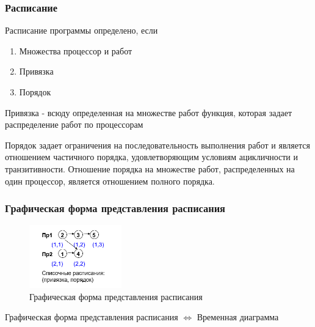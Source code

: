 \documentclass[hyperref=unicode, aspectratio=169]{beamer}
\begin{document}
\begin{frame}
    \frametitle{Расписание}
    Расписание программы определено, если
    \begin{enumerate}
        \item Множества процессор и работ
        \item Привязка
        \item Порядок
    \end{enumerate}
    \par
    Привязка - всюду определенная на множестве работ функция, которая задает распределение работ по процессорам
    \par
    Порядок задает ограничения на последовательность выполнения работ и является отношением частичного порядка, удовлетворяющим условиям ацикличности и транзитивности. Отношение порядка на множестве работ, распределенных на \\один процессор, является отношением полного порядка.
\end{frame}

\begin{frame}
    \frametitle{Графическая форма представления расписания}
    \begin{figure}
        \includegraphics[width=4cm]{imgs/time_form.png}
        \captionsetup{labelformat=empty}
        \caption{\small Графическая форма представления расписания}
    \end{figure}
    Графическая форма представления расписания $\Leftrightarrow$ Временная диаграмма
\end{frame}
\end{document}
